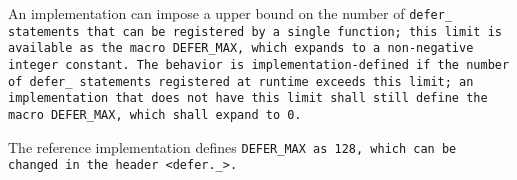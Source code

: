 An implementation can impose a upper bound on the number of \tt{defer_}
statements that can be registered by a single function; this limit is available
as the macro \tt{DEFER_MAX}, which expands to a non-negative integer constant.
The behavior is implementation-defined if the number of \tt{defer_} statements
registered at runtime exceeds this limit; an implementation that does not have
this limit shall still define the macro \tt{DEFER_MAX}, which shall expand to 0.

\note The reference implementation defines \tt{DEFER_MAX} as 128,
which can be changed in the header \tt{<defer._>}.

\enlargethispage*{\baselineskip}
\pagebreak
